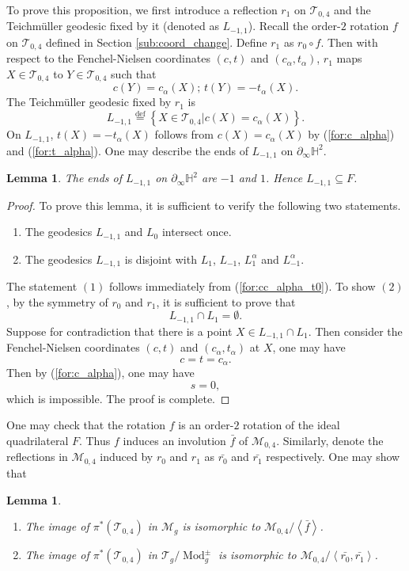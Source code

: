 \documentclass[UTF8]{amsart}
\newtheorem{lemma}[theorem]{Lemma}
\numberwithin{equation}{section}
\theoremstyle{definition}
\theoremstyle{example}
\theoremstyle{remark}
\DeclareMathOperator{\modo}{Mod}
\begin{document}
To prove this proposition, we first introduce a reflection $r_1$ on $\mathcal{T}_{0,4}$ and the Teichm\"uller geodesic fixed by it (denoted as $L_{-1,1}$). 
Recall the order-$2$ rotation $f$ on $\mathcal{T}_{0,4}$ defined in Section \ref{sub:coord_change}. 
Define $r_1$ as $r_0\circ f$. Then with respect to the Fenchel-Nielsen coordinates $(c,t)$ and $(c_{\alpha}, t_{\alpha})$, $r_1$ maps $X\in\mathcal{T}_{0,4}$ to $Y\in\mathcal{T}_{0,4}$ such that
\[
 c(Y) = c_{\alpha}(X); \, t(Y) = -t_{\alpha}(X). 
\]
The Teichm\"uller geodesic fixed by $r_1$ is 
\[
 L_{-1,1} \overset{\mathrm{def}}{=} \left\{ X\in \mathcal{T}_{0,4} | c(X) = c_{\alpha}(X)\right\}. 
\]
On $L_{-1,1}$, $t(X) = -t_{\alpha}(X)$ follows from $c(X) = c_{\alpha}(X)$ by (\ref{for:c_alpha}) and (\ref{for:t_alpha}).
One may describe the ends of $L_{-1,1}$ on $\partial_{\infty}\mathbb{H}^2$. 
\begin{lemma}
The ends of $L_{-1,1}$ on $\partial_{\infty}\mathbb{H}^2$ are $-1$ and $1$. Hence $L_{-1,1} \subseteq F$.  
 \label{lem:l_pm1}
\end{lemma}
\begin{proof}
 To prove this lemma, it is sufficient to verify the following two statements. 
 \begin{enumerate}
  \item The geodesics $L_{-1,1}$ and $L_0$ intersect once. 
  \item The geodesics $L_{-1,1}$ is disjoint with $L_{1}$, $L_{-1}$, $L^{\alpha}_{1}$ and $L^{\alpha}_{-1}$. 
 \end{enumerate}
 The statement $(1)$ follows immediately from (\ref{for:cc_alpha_t0}). 
 To show $(2)$, by the symmetry of $r_0$ and $r_1$, it is sufficient to prove that
 \[
  L_{-1,1} \cap L_1 = \emptyset. 
 \]
 Suppose for contradiction that there is a point $X \in L_{-1,1} \cap L_1$. Then consider the Fenchel-Nielsen coordinates $(c,t)$ and $(c_{\alpha}, t_{\alpha})$ at $X$, one may have
 \[
  c = t = c_{\alpha}. 
 \]
 Then by (\ref{for:c_alpha}), one may have
 \[
  s = 0, 
 \]
 which is impossible. The proof is complete. 
\end{proof}
One may check that the rotation $f$ is an order-$2$ rotation of the ideal quadrilateral $F$. 
Thus $f$ induces an involution $\bar{f}$ of $\mathcal{M}_{0,4}$.
Similarly, denote the reflections in $\mathcal{M}_{0,4}$ induced by $r_0$ and $r_1$ as $\bar{r_0}$ and $\bar{r_1}$ respectively. 
One may show that 
\begin{lemma}
 \begin{enumerate}
  \item The image of $\pi^{*}(\mathcal{T}_{0,4}) $ in $\mathcal{M}_g$ is isomorphic to $\mathcal{M}_{0,4}/ \left<\bar{f} \right>$.
  \item The image of $\pi^{*}(\mathcal{T}_{0,4}) $ in $\mathcal{T}_g/ \modo^{\pm}_g$ is isomorphic to $\mathcal{M}_{0,4}/\left< \bar{r_0}, \bar{r_1} \right>$.
 \end{enumerate}
   \label{lem:modo}
\end{lemma}
\end{document}
